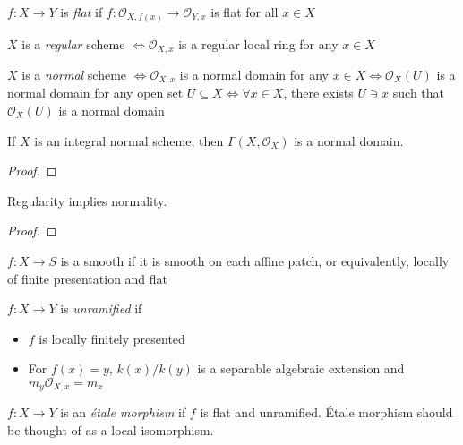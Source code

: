 \documentclass[main]{subfiles}
\begin{document}
\begin{definition}
$f:X\to Y$ is \textit{flat} if $f:\mathcal O_{X,f(x)}\to\mathcal O_{Y,x}$ is flat for all $x\in X$
\end{definition}

\begin{definition}
$X$ is a \textit{regular} scheme $\iff\mathcal O_{X,x}$ is a regular local ring for any $x\in X$
\end{definition}

\begin{definition}
$X$ is a \textit{normal} scheme $\iff\mathcal O_{X,x}$ is a normal domain for any $x\in X\iff\mathcal O_X(U)$ is a normal domain for any open set $U\subseteq X\iff\forall x\in X$, there exists $U\ni x$ such that $\mathcal O_X(U)$ is a normal domain
\end{definition}

\begin{lemma}
If $X$ is an integral normal scheme, then $\Gamma(X,\mathcal O_X)$ is a normal domain.
\end{lemma}

\begin{proof}

\end{proof}

\begin{lemma}
Regularity implies normality.
\end{lemma}

\begin{proof}

\end{proof}

\begin{definition}
$f:X\to S$ is a smooth if it is smooth on each affine patch, or equivalently, locally of finite presentation and flat
\end{definition}

\begin{definition}
$f:X\to Y$ is \textit{unramified} if
\begin{itemize}
\item $f$ is locally finitely presented
\item For $f(x)=y$, $k(x)/k(y)$ is a separable algebraic extension and $m_y\mathcal O_{X,x}=m_{x}$
\end{itemize}
\end{definition}

\begin{definition}
$f:X\to Y$ is an \textit{\'etale morphism} if $f$ is flat and unramified. \'Etale morphism should be thought of as a local isomorphism.
\end{definition}
\end{document}
